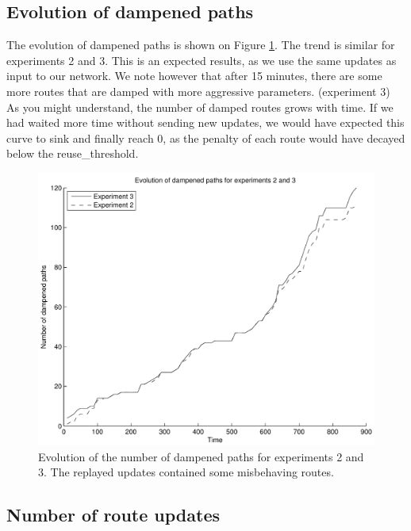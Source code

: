 \documentclass[a4paper,english]{IEEEtran}
\begin{document}
\subsection{Evolution of dampened paths}

The evolution of dampened paths is shown on Figure \ref{fig_dampenedpaths}. The trend is similar for experiments 2 and 3. This is an expected results,
as we use the same updates as input to our network. We note however that after 15 minutes, there are some more routes that are damped 
with more aggressive parameters. (experiment 3)
As you might understand, the number of damped routes grows with time. If we had waited more time without sending
new updates, we would have expected this curve to sink and finally reach 0, as the penalty of each route would
have decayed below the reuse\_threshold.

\begin{figure}
\begin{center}
\includegraphics[scale=.5]{img/dampened_paths.pdf}
\end{center}
\caption{Evolution of the number of dampened paths for experiments 2 and 3. The replayed updates contained some misbehaving routes.}
\label{fig_dampenedpaths}
\end{figure}

\subsection{Number of route updates}
\end{document}
